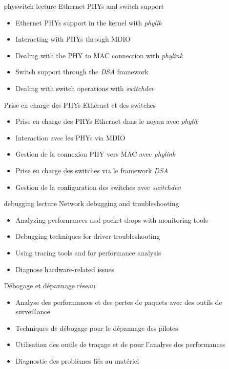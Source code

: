 {physwitch}
{lecture}
{Ethernet PHYs and switch support}
{
  \begin{itemize}
  \item Ethernet PHYs support in the kernel with {\em phylib}
  \item Interacting with PHYs through MDIO
  \item Dealing with the PHY to MAC connection with {\em phylink}
  \item Switch support through the {\em DSA} framework
  \item Dealing with switch operations with {\em switchdev}
  \end{itemize}
}
{Prise en charge des PHYs Ethernet et des switches}
{
  \begin{itemize}
  \item Prise en charge des PHYs Ethernet dans le noyau avec {\em phylib}
  \item Interaction avec les PHYs via MDIO
  \item Gestion de la connexion PHY vers MAC avec {\em phylink}
  \item Prise en charge des switches via le framework {\em DSA}
  \item Gestion de la configuration des switches avec {\em switchdev}
  \end{itemize}
}

{debugging}
{lecture}
{Network debugging and troubleshooting}
{
  \begin{itemize}
  \item Analyzing performances and packet drops with monitoring tools
  \item Debugging techniques for driver troubleshooting
  \item Using tracing tools and  for performance analysis
  \item Diagnose hardware-related issues
  \end{itemize}
}
{Débogage et dépannage réseau}
{
  \begin{itemize}
  \item Analyse des performances et des pertes de paquets avec des
    outils de surveillance
  \item Techniques de débogage pour le dépannage des pilotes
  \item Utilisation des outils de traçage et de  pour
    l’analyse des performances
  \item Diagnostic des problèmes liés au matériel
  \end{itemize}
}

